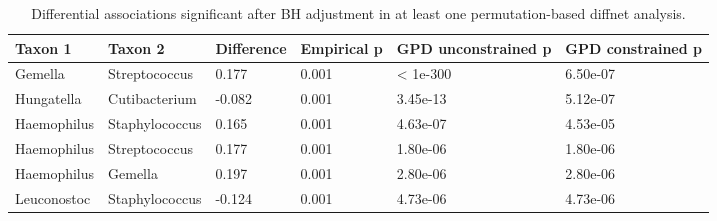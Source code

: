 \begin{table}

\caption{\label{tab:diffnet_significant_BH_table}Differential associations significant after BH adjustment in at least one permutation-based diffnet analysis.}
\centering
\begin{tabular}[t]{llllll}
\toprule
Taxon 1 & Taxon 2 & Difference & Empirical p & GPD unconstrained p & GPD constrained p\\
\midrule
Gemella & Streptococcus & 0.177 & 0.001 & < 1e-300 & 6.50e-07\\
Hungatella & Cutibacterium & -0.082 & 0.001 & 3.45e-13 & 5.12e-07\\
Haemophilus & Staphylococcus & 0.165 & 0.001 & 4.63e-07 & 4.53e-05\\
Haemophilus & Streptococcus & 0.177 & 0.001 & 1.80e-06 & 1.80e-06\\
Haemophilus & Gemella & 0.197 & 0.001 & 2.80e-06 & 2.80e-06\\
\addlinespace
Leuconostoc & Staphylococcus & -0.124 & 0.001 & 4.73e-06 & 4.73e-06\\
\bottomrule
\end{tabular}
\end{table}
